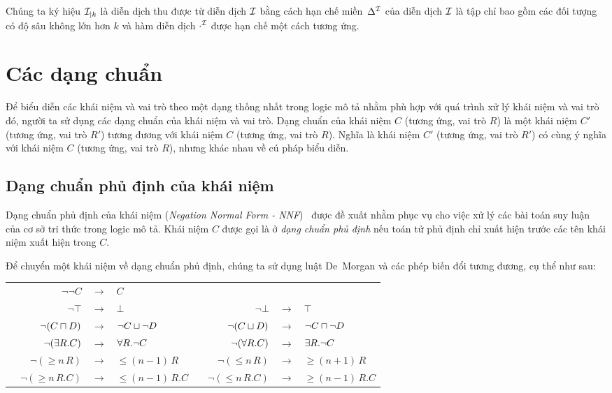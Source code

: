Chúng ta ký hiệu $\mathcal{I}_{\mid k}$ là diễn dịch thu được từ diễn dịch $\mathcal{I}$ bằng cách hạn chế miền~$\Delta^{\mathcal{I}}$ của diễn dịch $\mathcal{I}$ là tập chỉ bao gồm các đối tượng có độ sâu không lớn hơn $k$ và hàm diễn dịch $\cdot^{\mathcal{I}}$ được hạn chế một cách tương ứng.
\section{Các dạng chuẩn}
\label{sec:Chap1.NormalForms}

Để biểu diễn các khái niệm và vai trò theo một dạng thống nhất trong logic mô tả nhằm phù hợp với quá trình xử lý khái niệm và vai trò đó, người ta sử dụng các dạng chuẩn của khái niệm và vai trò. Dạng chuẩn của khái niệm $C$ (tương ứng, vai trò $R$) là một khái niệm $C'$ (tương ứng, vai trò $R'$) tương đương với khái niệm $C$ (tương ứng, vai trò $R$). Nghĩa là khái niệm $C'$ (tương ứng, vai trò $R'$) có cùng ý nghĩa với khái niệm $C$ (tương ứng, vai trò $R$), nhưng khác nhau về cú pháp biểu diễn.

\subsection{Dạng chuẩn phủ định của khái niệm}
\label{sec:Chap1.NegationNormalForm}
Dạng chuẩn phủ định của khái niệm ({\em Negation Normal Form - NNF})~\cite{DLHandbook2007,Lehmann2006} được đề xuất nhằm phục vụ cho việc xử lý các bài toán suy luận của cơ sở tri thức trong logic mô tả. 
Khái niệm $C$ được gọi là ở {\em dạng chuẩn phủ định} nếu toán tử phủ định chỉ xuất hiện trước các tên khái niệm xuất hiện trong $C$.

Để chuyển một khái niệm về dạng chuẩn phủ định, chúng ta sử dụng luật De~Morgan và các phép biến đổi tương đương, cụ thể như sau:\\[1.0ex]
\begin{tabular}{c r c l c r c l}
	& $\neg \neg C$ & $\longrightarrow$ & $C$\\[0.5ex]
	& $\neg \top$ & $\longrightarrow$ & $\bot$ & & $\neg \bot$ & $\longrightarrow$ & $\top$\\[0.5ex]
	& $\neg (C \sqcap D)$ & $\longrightarrow$ & $\neg C \sqcup \neg D$ & & $\neg (C \sqcup D)$ & $\longrightarrow$ & $\neg C \sqcap \neg D$\\[0.5ex]
	& $\neg (\exists R.C)$ & $\longrightarrow$ & $\forall R.\neg C$ & & $\neg (\forall R.C)$ & $\longrightarrow$ & $\exists R.\neg C$\\[0.5ex]
	& $\neg (\geq\!n\,R)$ & $\longrightarrow$ & $\leq\!(n-1)\,R$ & & $\neg (\leq\!n\,R)$ & $\longrightarrow$ & $\geq\!(n+1)\,R$\\[0.5ex]
	& $\neg (\geq\!n\,R.C)$ & $\longrightarrow$ & $\leq\!(n-1)\,R.C$ &\qquad\qquad\qquad & $\neg (\leq\!n\,R.C)$ & $\longrightarrow$ & $\geq\!(n-1)\,R.C$\\[0.5ex]
\end{tabular}

